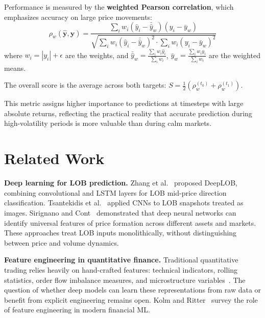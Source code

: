 \documentclass[11pt,a4paper]{article}
\newcommand{\wpearson}{\rho_w}
\newcommand{\by}{\mathbf{y}}
\begin{document}
Performance is measured by the \textbf{weighted Pearson correlation}, which emphasizes accuracy on large price movements:
\begin{equation}
    \wpearson(\hat{\by}, \by) = \frac{\sum_{i} w_i \left(\hat{y}_i - \bar{\hat{y}}_w\right)\left(y_i - \bar{y}_w\right)}
    {\sqrt{\sum_{i} w_i \left(\hat{y}_i - \bar{\hat{y}}_w\right)^2 \cdot \sum_{i} w_i \left(y_i - \bar{y}_w\right)^2}}
    \label{eq:wpearson}
\end{equation}
where $w_i = |y_i| + \epsilon$ are the weights, and $\bar{\hat{y}}_w = \frac{\sum_i w_i \hat{y}_i}{\sum_i w_i}$, $\bar{y}_w = \frac{\sum_i w_i y_i}{\sum_i w_i}$ are the weighted means.

The overall score is the average across both targets: $S = \frac{1}{2}\left(\wpearson^{(t_0)} + \wpearson^{(t_1)}\right)$.

This metric assigns higher importance to predictions at timesteps with large absolute returns, reflecting the practical reality that accurate prediction during high-volatility periods is more valuable than during calm markets.


\section{Related Work}
\label{sec:related}

\textbf{Deep learning for LOB prediction.} Zhang et al.~\cite{zhang2019deeplob} proposed DeepLOB, combining convolutional and LSTM layers for LOB mid-price direction classification. Tsantekidis et al.~\cite{tsantekidis2017using} applied CNNs to LOB snapshots treated as images. Sirignano and Cont~\cite{sirignano2019universal} demonstrated that deep neural networks can identify universal features of price formation across different assets and markets. These approaches treat LOB inputs monolithically, without distinguishing between price and volume dynamics.

\textbf{Feature engineering in quantitative finance.} Traditional quantitative trading relies heavily on hand-crafted features: technical indicators, rolling statistics, order flow imbalance measures, and microstructure variables~\cite{cartea2015algorithmic}. The question of whether deep models can learn these representations from raw data or benefit from explicit engineering remains open. Kolm and Ritter~\cite{kolm2020modern} survey the role of feature engineering in modern financial ML.
\end{document}
